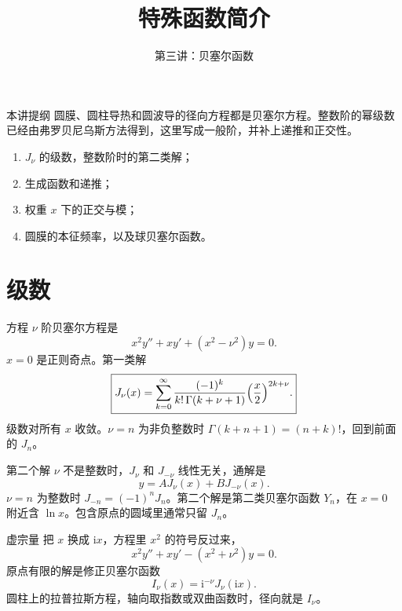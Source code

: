 \documentclass[fontset=windows, chinese, 10pt, xcolor=dvipsnames]{beamer}
\title{特殊函数简介}
\subtitle{第三讲：贝塞尔函数}
\begin{document}
\begin{frame}
  \titlepage
\end{frame}

\begin{frame}{本讲提纲}
  圆膜、圆柱导热和圆波导的径向方程都是贝塞尔方程。整数阶的幂级数已经由弗罗贝尼乌斯方法得到，这里写成一般阶，并补上递推和正交性。
  \begin{enumerate}
    \item $J_{\nu}$ 的级数，整数阶时的第二类解；
    \item 生成函数和递推；
    \item 权重 $x$ 下的正交与模；
    \item 圆膜的本征频率，以及球贝塞尔函数。
  \end{enumerate}
\end{frame}

\section{级数}

\begin{frame}{方程}
  $\nu$ 阶贝塞尔方程是
  \begin{equation*}
    x^2 y''+x y'+(x^2-\nu^2)y=0.
  \end{equation*}
  $x=0$ 是正则奇点。第一类解
  \begin{equation*}
    \boxed{\displaystyle
      J_{\nu}(x)
      =\sum_{k=0}^{\infty}
        \frac{(-1)^k}{k!\,\Gamma(k+\nu+1)}
        \Bigl(\frac{x}{2}\Bigr)^{2k+\nu}.}
  \end{equation*}
  级数对所有 $x$ 收敛。$\nu=n$ 为非负整数时 $\Gamma(k+n+1)=(n+k)!$，回到前面的 $J_n$。
\end{frame}

\begin{frame}{第二个解}
  $\nu$ 不是整数时，$J_{\nu}$ 和 $J_{-\nu}$ 线性无关，通解是
  \[
    y=A J_{\nu}(x)+B J_{-\nu}(x).
  \]
  $\nu=n$ 为整数时 $J_{-n}=(-1)^n J_n$。第二个解是第二类贝塞尔函数 $Y_n$，在 $x=0$ 附近含 $\ln x$。包含原点的圆域里通常只留 $J_n$。
\end{frame}

\begin{frame}{虚宗量}
  把 $x$ 换成 $\mathrm{i}x$，方程里 $x^2$ 的符号反过来，
  \[
    x^2 y''+x y'-(x^2+\nu^2)y=0.
  \]
  原点有限的解是修正贝塞尔函数
  \[
    I_{\nu}(x)=\mathrm{i}^{-\nu}J_{\nu}(\mathrm{i}x).
  \]
  圆柱上的拉普拉斯方程，轴向取指数或双曲函数时，径向就是 $I_{\nu}$。
\end{frame}
\end{document}
